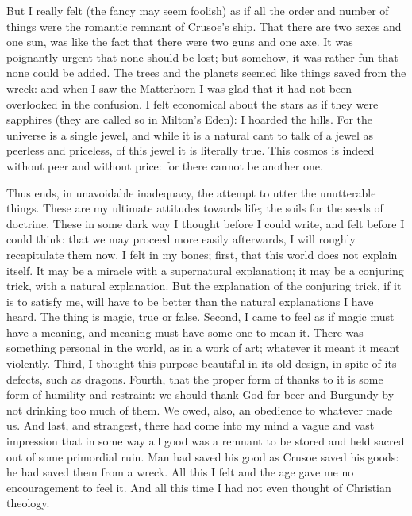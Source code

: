 \documentclass{book}
\begin{document}
But I really felt (the fancy may seem foolish) as if all the order and number of things were the romantic remnant of Crusoe’s ship. That there are two sexes and one sun, was like the fact that there were two guns and one axe. It was poignantly urgent that none should be lost; but somehow, it was rather fun that none could be added. The trees and the planets seemed like things saved from the wreck: and when I saw the Matterhorn I was glad that it had not been overlooked in the confusion. I felt economical about the stars as if they were sapphires (they are called so in Milton’s Eden): I hoarded the hills. For the universe is a single jewel, and while it is a natural cant to talk of a jewel as peerless and priceless, of this jewel it is literally true. This cosmos is indeed without peer and without price: for there cannot be another one.

Thus ends, in unavoidable inadequacy, the attempt to utter the unutterable things. These are my ultimate attitudes towards life; the soils for the seeds of doctrine. These in some dark way I thought before I could write, and felt before I could think: that we may proceed more easily afterwards, I will roughly recapitulate them now. I felt in my bones; first, that this world does not explain itself. It may be a miracle with a supernatural explanation; it may be a conjuring trick, with a natural explanation. But the explanation of the conjuring trick, if it is to satisfy me, will have to be better than the natural explanations I have heard. The thing is magic, true or false. Second, I came to feel as if magic must have a meaning, and meaning must have some one to mean it. There was something personal in the world, as in a work of art; whatever it meant it meant violently. Third, I thought this purpose beautiful in its old design, in spite of its defects, such as dragons. Fourth, that the proper form of thanks to it is some form of humility and restraint: we should thank God for beer and Burgundy by not drinking too much of them. We owed, also, an obedience to whatever made us. And last, and strangest, there had come into my mind a vague and vast impression that in some way all good was a remnant to be stored and held sacred out of some primordial ruin. Man had saved his good as Crusoe saved his goods: he had saved them from a wreck. All this I felt and the age gave me no encouragement to feel it. And all this time I had not even thought of Christian theology.
\end{document}
